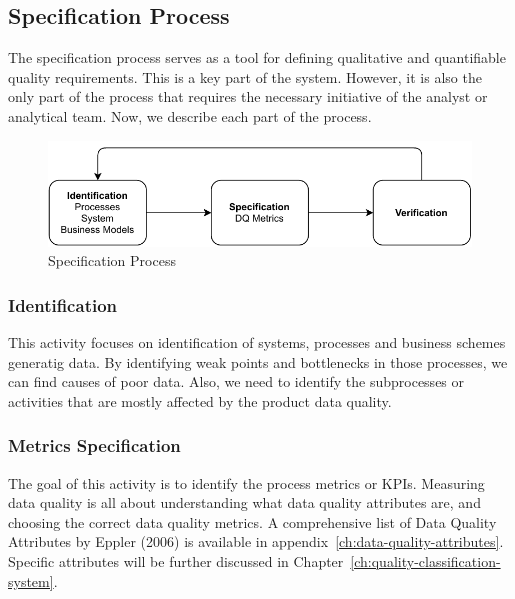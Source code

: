 \subsection{Specification Process}

The specification process serves as a tool for defining qualitative and quantifiable quality requirements.
This is a key part of the system.
However, it is also the only part of the process that requires the necessary initiative of the analyst or analytical team.
Now, we describe each part of the process.

\begin{figure}[htb]
    \centering
    \includegraphics[width=.8\textwidth]{figures/specification-process.pdf}
    \caption{Specification Process}
    \label{fig:specification-process}
\end{figure}
\FloatBarrier

\subsubsection{Identification}

This activity focuses on identification of systems, processes and business schemes generatig data.
By identifying weak points and bottlenecks in those processes, we can find causes of poor data.
Also, we need to identify the subprocesses or activities that are mostly affected by the product data quality.

\subsubsection{Metrics Specification}

The goal of this activity is to identify the process metrics or KPIs.
Measuring data quality is all about understanding what data quality attributes are, and choosing the correct data quality metrics.
A comprehensive list of Data Quality Attributes by Eppler (2006) is available in appendix~\ref{ch:data-quality-attributes}.
Specific attributes will be further discussed in Chapter~\ref{ch:quality-classification-system}.

